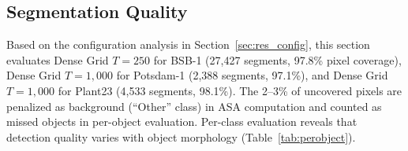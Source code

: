 \documentclass[review,11pt,authoryear]{elsarticle}
\begin{document}
\FloatBarrier
\subsection{Segmentation Quality}
\label{sec:res_quality}

Based on the configuration analysis in Section~\ref{sec:res_config}, this section evaluates Dense Grid $T = 250$ for BSB-1 (27{,}427 segments, 97.8\% pixel coverage), Dense Grid $T = 1{,}000$ for Potsdam-1 (2{,}388 segments, 97.1\%), and Dense Grid $T = 1{,}000$ for Plant23 (4{,}533 segments, 98.1\%). The 2--3\% of uncovered pixels are penalized as background (``Other'' class) in ASA computation and counted as missed objects in per-object evaluation. Per-class evaluation reveals that detection quality varies with object morphology (Table~\ref{tab:perobject}).
\end{document}

